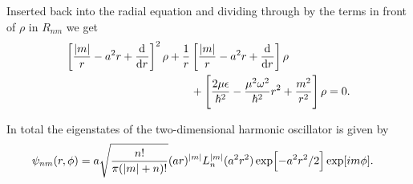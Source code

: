         Inserted back into the radial equation and dividing through by the terms
        in front of $\rho$ in $R_{nm}$ we get
        \begin{align}
            \brak{
                \frac{\abs{m}}{r} - a^2 r + \dod{}{r}
            }^2 \rho
            &+ \frac{1}{r}\brak{
                \frac{\abs{m}}{r} - a^2 r + \dod{}{r}
            }\rho
            \nonumber \\
            &\qquad
            + \brak{
                \frac{2\mu \epsilon}{\hslash^2}
                - \frac{\mu^2\omega^2}{\hslash^2} r^2
                + \frac{m^2}{r^2}
            } \rho
            = 0.
        \end{align}


        In total the eigenstates of the two-dimensional harmonic oscillator is
        given by
        \begin{align}
            \psi_{nm}(r, \phi)
            &= a\sqrt{\frac{n!}{\pi(\abs{m} + n)!}}
            (ar)^{\abs{m}} L^{\abs{m}}_n(a^2 r^2)
            \exp[-a^2 r^2/2]
            \exp[im\phi].
            \label{eq:eigenstate-tdho}
        \end{align}


